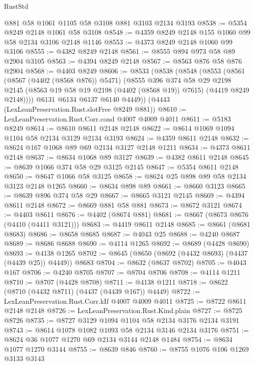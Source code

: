 \begin{lexlean}{RustStd}
\begin{coremodule}
    @881
    @58
    @1061
    @1105
    @58
    @3108
    @881
    @3103
    @2134
    @3193
@8538 := @5354 @8249 @2148 @1061 @58 @3108
@8548 := @4359 @8249 @2148 @155 @1060 @99 @58 @2134 @3106 @2148 @1146
@8553 := @4373 @8249 @2148 @1060 @99 @3106
@8555 := @4382 @8249 @2148
@8561 := @8555 @894 @973 @58 @89 @2904 @3105
@8563 := @4394 @8249 @2148
@8567 := @8563 @876 @58 @876 @2904
@8568 := @4403 @8249
@8606 := @8533
    (@8538
      (@8548
        (@8553
          (@8561
            (@8567 (@4402 (@8568 @876)) @5471)
            (@8555
              @396
              @374
              @58
              @29
              @2198
              @2145
              (@8563 @19 @58 @19 @2198 (@4402 (@8568 @19)) @7615)
              (@4419 @8249 @2148))))
        @6131
        @6134
        @6137
        @6140
        @4449))
    (@4443 (LexLeanPreservation.Rust.slotFree @8249 @881))
@8610 := LexLeanPreservation.Rust.Corr.cond @4007 @4009 @4011
@8611 := @5183 @8249
@8614 := @8610 @8611 @2148 @2148
@8622 := @8614 @1069 @1094 @1104 @58 @2134 @3129 @2134 @3193
@8624 := @4359 @8611 @2148
@8632 := @8624 @167 @1068 @89 @69 @2134 @3127 @2148 @1211
@8634 := @4373 @8611 @2148
@8637 := @8634 @1068 @89 @3127
@8639 := @4382 @8611 @2148
@8645 := @8639 @1066 @374 @58 @29 @3125 @2145
@8647 := @5354 @8611 @2148
@8650 := @8647 @1066 @58 @3125
@8658 := @8624 @25 @898 @89 @58 @2134 @3123 @2148 @1265
@8660 := @8634 @898 @89
@8661 := @8660 @3123
@8665 := @8639 @896 @374 @58 @29
@8667 := @8665 @3121 @2145
@8669 := @4394 @8611 @2148
@8672 := @8669 @881 @58 @881
@8673 := @8672 @3121
@8674 := @4403 @8611
@8676 := @4402 (@8674 @881)
@8681 := @8667 (@8673 @8676 (@4410 (@4411 @3121)))
@8683 := @4419 @8611 @2148
@8685 := @8661 (@8681 @8683)
@8686 := @8658 @8685
@8687 := @4043 @25
@8688 := @4240 @8687
@8689 := @8686 @8688
@8690 := @4114 @1265
@8692 := @8689 (@4428 @8690)
@8693 := @4138 @1265
@8702 := @8645 (@8650 (@8692 (@4432 @8693) (@4437 (@4439 @25)) @4449)) @8683
@8704 := @8632 (@8637 @8702)
@8705 := @4043 @167
@8706 := @4240 @8705
@8707 := @8704 @8706
@8708 := @4114 @1211
@8710 := @8707 (@4428 @8708)
@8711 := @4138 @1211
@8718 := @8622 (@8710 (@4432 @8711) (@4437 (@4439 @167)) @4449)
@8722 := LexLeanPreservation.Rust.Corr.kIf @4007 @4009 @4011
@8725 := @8722 @8611 @2148 @2148
@8726 := LexLeanPreservation.Rust.Kind.plain
@8727 := @8725 @8726
@8735 := @8727 @3129 @1094 @1104 @58 @2134 @3176 @2134 @3191
@8743 := @8614 @1078 @1082 @1093 @58 @2134 @3146 @2134 @3176
@8751 := @8624 @36 @1077 @1270 @69 @2134 @3144 @2148 @1484
@8754 := @8634 @1077 @1270 @3144
@8755 := @8639 @846
@8760 := @8755 @1076 @106 @1269 @3133 @3143

\end{coremodule}
\end{lexlean}
